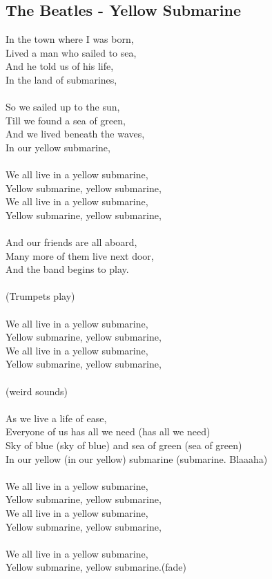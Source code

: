 \documentclass[a4paper,12pt]{book} %
\begin{document}
\begin{multicols}{2}
\normalsize %
\textcolor{customColor}{
\tableofcontents
\clearpage
\chapter{The Beatles - Yellow Submarine}
\noindent
In the town where I was born,\\Lived a man who sailed to sea,\\And he told us of his life,\\In the land of submarines,\\\\So we sailed up to the sun,\\Till we found a sea of green,\\And we lived beneath the waves,\\In our yellow submarine,\\\\We all live in a yellow submarine, \\Yellow submarine, yellow submarine,\\We all live in a yellow submarine, \\Yellow submarine, yellow submarine,\\\\And our friends are all aboard,\\Many more of them live next door,\\And the band begins to play.\\\\(Trumpets play)\\\\We all live in a yellow submarine, \\Yellow submarine, yellow submarine,\\We all live in a yellow submarine, \\Yellow submarine, yellow submarine,\\\\(weird sounds)\\\\As we live a life of ease,\\Everyone of us has all we need (has all we need)\\Sky of blue (sky of blue) and sea of green (sea of green)\\In our yellow (in our yellow) submarine (submarine. Blaaaha)\\\\We all live in a yellow submarine, \\Yellow submarine, yellow submarine,\\We all live in a yellow submarine, \\Yellow submarine, yellow submarine,\\\\We all live in a yellow submarine, \\Yellow submarine, yellow submarine.(fade)
}
\end{multicols}
\end{document}
